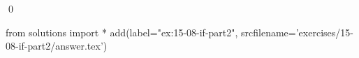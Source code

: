
\begin{ex}
  \label{ex:15-08-if-part2}
  
  \qed
\end{ex}
\begin{python0}
from solutions import *
add(label="ex:15-08-if-part2",
    srcfilename='exercises/15-08-if-part2/answer.tex')
\end{python0}
